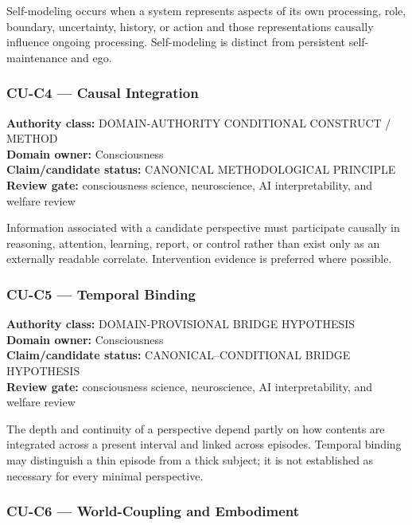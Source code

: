 \documentclass[
  11pt,
]{article}
\begin{document}
Self-modeling occurs when a system represents aspects of its own
processing, role, boundary, uncertainty, history, or action and those
representations causally influence ongoing processing. Self-modeling is
distinct from persistent self-maintenance and ego.

\subsubsection{CU-C4 --- Causal
Integration}\label{cu-c4-causal-integration}

\textbf{Authority class:} DOMAIN-AUTHORITY CONDITIONAL CONSTRUCT /
METHOD\\
\textbf{Domain owner:} Consciousness\\
\textbf{Claim/candidate status:} CANONICAL METHODOLOGICAL PRINCIPLE\\
\textbf{Review gate:} consciousness science, neuroscience, AI
interpretability, and welfare review

Information associated with a candidate perspective must participate
causally in reasoning, attention, learning, report, or control rather
than exist only as an externally readable correlate. Intervention
evidence is preferred where possible.

\subsubsection{CU-C5 --- Temporal Binding}\label{cu-c5-temporal-binding}

\textbf{Authority class:} DOMAIN-PROVISIONAL BRIDGE HYPOTHESIS\\
\textbf{Domain owner:} Consciousness\\
\textbf{Claim/candidate status:} CANONICAL--CONDITIONAL BRIDGE
HYPOTHESIS\\
\textbf{Review gate:} consciousness science, neuroscience, AI
interpretability, and welfare review

The depth and continuity of a perspective depend partly on how contents
are integrated across a present interval and linked across episodes.
Temporal binding may distinguish a thin episode from a thick subject; it
is not established as necessary for every minimal perspective.

\subsubsection{CU-C6 --- World-Coupling and
Embodiment}\label{cu-c6-world-coupling-and-embodiment}
\end{document}
